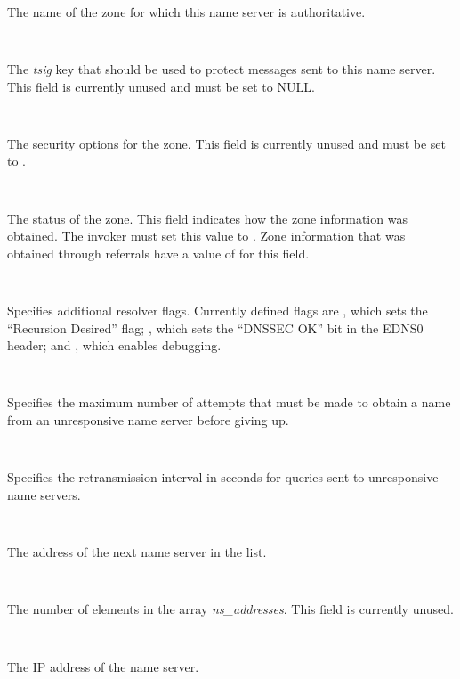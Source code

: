 \begin{description}

\item {}\verb" "

The name of the zone for which this name server is authoritative.  

\item {}\verb" "

The {\it tsig} key that should be used to protect messages sent to this name
server.  This field is currently unused and must be set to NULL.

\item {}\verb" "

The security options for the zone.  This field is currently unused and must be
set to .

\item {}\verb" "

The status of the zone.  This field indicates how the zone information was
obtained.  The invoker must set this value to .
Zone information that was obtained through referrals have a value of
 for this field.

\item {}\verb" "

Specifies additional resolver flags. Currently defined flags are
, which sets the ``Recursion Desired'' flag;
, which sets the ``DNSSEC OK'' bit in the EDNS0
header; and , which enables debugging.

\item {}\verb" "

Specifies the maximum number of attempts that must be made to obtain a name
from an unresponsive name server before giving up.

\item {}\verb" "

Specifies the retransmission interval in seconds for queries sent to
unresponsive name servers.

\item {}\verb" "

The address of the next name server in the list.

\item {}\verb" "

The number of elements in the array {\it ns\_addresses}.  This field is
currently unused.

\item {}\verb" "

The IP address of the name server.  

\end{description}

